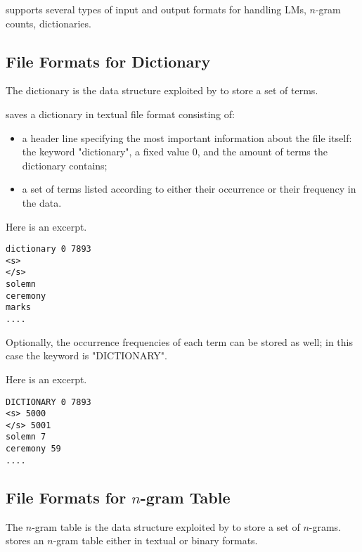 {\IRSTLM} supports several types of input and output formats for handling LMs, $n$-gram counts, dictionaries.



\subsection{File Formats for Dictionary}
The dictionary is the data structure exploited by  {\IRSTLM} to store a set of terms. 

{\IRSTLM} saves a dictionary in textual file format consisting of:
\begin{itemize}
\item a header line specifying the most important information about the file itself: the keyword "dictionary", a fixed value 0, and the amount of terms the dictionary contains;
\item a set of terms listed according to either their occurrence or their frequency in the data.
\end{itemize}
Here is an excerpt.
\begin{verbatim}
dictionary 0 7893
<s>
</s>
solemn
ceremony
marks
....
\end{verbatim}

\noindent
Optionally, the occurrence frequencies of each term can be stored as well; in this case the keyword is "DICTIONARY".

\noindent
Here is an excerpt.
\begin{verbatim}
DICTIONARY 0 7893
<s> 5000
</s> 5001
solemn 7
ceremony 59
....
\end{verbatim}


\subsection{File Formats for $n$-gram Table}
The $n$-gram table is the data structure exploited by  {\IRSTLM} to store a set of $n$-grams. {\IRSTLM} stores an $n$-gram table either in textual or binary formats.

